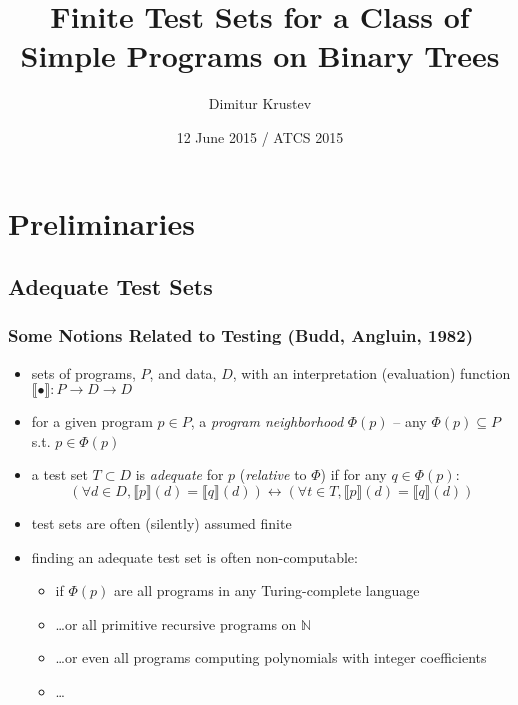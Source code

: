 \documentclass{beamer}
\title[Tests for Simple Programs on Trees]
  {Finite Test Sets for a Class of Simple Programs on Binary Trees}
\author{Dimitur Krustev}
\institute[IGE+XAO Balkan]
{
  IGE+XAO Balkan \\ \vspace{0.3cm} \pgfuseimage{mylogo1}
}
\date[ATCS 2015]{12 June 2015 / ATCS 2015}
\begin{document}
\begin{frame}
\maketitle
\end{frame}

\begin{frame}[Outline]
  \tableofcontents
\end{frame}

\section{Preliminaries}

\subsection{Adequate Test Sets}

\begin{frame}
  \frametitle{Some Notions Related to Testing (Budd, Angluin, 1982)}
  \begin{itemize}
    \item sets of programs, $P$, and data, $D$, with an interpretation (evaluation) function 
      $\llbracket \bullet \rrbracket : P \rightarrow D \rightarrow D$
    \item for a given program $p \in P$, a \emph{program neighborhood} $\Phi(p)$ -- any
      $\Phi(p) \subseteq P$ s.t. $p \in \Phi(p)$
    \item a test set $T \subset D$ is \emph{adequate} for $p$ (\emph{relative} to $\Phi$)
      if for any $q \in \Phi(p)$:
      \[(\forall d \in D, \llbracket p \rrbracket (d) = \llbracket q \rrbracket (d))
        \leftrightarrow 
        (\forall t \in T, \llbracket p \rrbracket (d) = \llbracket q \rrbracket (d))
      \]
    \item test sets are often (silently) assumed finite
    \item finding an adequate test set is often non-computable:
      \begin{itemize}
        \item if $\Phi(p)$ are all programs in any Turing-complete language
        \item \ldots or all primitive recursive programs on $\mathbb{N}$
        \item \ldots or even all programs computing polynomials with integer coefficients 
        \item \ldots
      \end{itemize}
  \end{itemize}
\end{frame}
\end{document}
